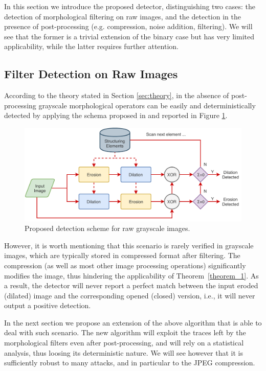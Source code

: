 \documentclass[review]{elsarticle}
\begin{document}
In this section we introduce the proposed detector, distinguishing two cases: the detection of morphological filtering on raw images, and the detection in the presence of post-processing (e.g. compression, noise addition, filtering). We will see that the former is a trivial extension of the binary case but has very limited applicability, while the latter requires further attention.

\subsection{Filter Detection on Raw Images}

According to the theory stated in Section \ref{sec:theory}, in the absence of post-processing grayscale morphological operators can be easily and deterministically detected by applying the schema proposed in \cite{de2017detecting} and reported in Figure \ref{fig:scheme}.

\begin{figure}[!ht]
	\centering
	\includegraphics[width=\linewidth]{diagram1}
	\caption{Proposed detection scheme for raw grayscale images.}
	\label{fig:scheme}
\end{figure}

However, it is worth mentioning that this scenario is rarely verified in grayscale images, which are typically stored in compressed format after filtering. The compression (as well as most other image processing operations) significantly modifies the image, thus hindering the applicability of Theorem~\ref{theorem_1}. As a result, the detector will never report a perfect match between the input eroded (dilated) image and the corresponding opened (closed) version, i.e., it will never output a positive detection.

In the next section we propose an extension of the above algorithm that is able to deal with such scenario. The new algorithm will exploit the traces left by the morphological filters even after post-processing, and will rely on a statistical analysis, thus loosing its deterministic nature. We will see however that it is sufficiently robust to many attacks, and in particular to the JPEG compression.
\end{document}
